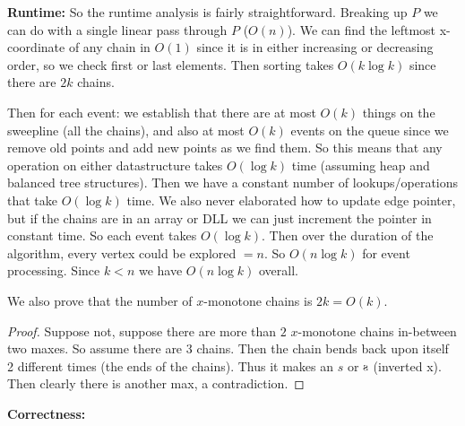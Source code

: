 \documentclass[11pt]{article}
\begin{document}
\textbf{Runtime:}
So the runtime analysis is fairly straightforward. Breaking up $P$ we can do with a single linear pass through $P$ ($O(n)$).
We can find the leftmost x-coordinate of any chain in $O(1)$ since it is in either increasing or decreasing order,
so we check first or last elements. Then sorting takes $O(k \log k)$ since there are $2k$ chains.

Then for each event: we establish that there are at most $O(k)$ things on the sweepline (all the chains),
and also at most $O(k)$ events on the queue since we remove old points and add new points as we find them.
So this means that any operation on either datastructure takes $O(\log k)$ time (assuming heap and balanced tree structures).
Then we have a constant number of lookups/operations that take $O(\log k)$ time. 
We also never elaborated how to update edge pointer, but if the chains are in an array or DLL we can just increment
the pointer in constant time. 
So each event takes $O(\log k)$.
Then over the duration of the algorithm, every vertex could be explored $=n$. So $O(n \log k)$ for event processing.
Since $k < n$ we have $O(n \log k)$ overall. 

We also prove that the number of $x$-monotone chains is $2k = O(k)$.
\begin{proof}
    Suppose not, suppose there are more than $2$ $x$-monotone chains in-between two maxes.
    So assume there are 3 chains. Then the chain bends back upon itself 2 different times (the ends of the chains).
    Thus it makes an $s$ or $\reflectbox{s}$ (inverted x). Then clearly there is another max, a contradiction.
\end{proof}

\textbf{Correctness:}
\end{document}
